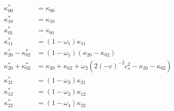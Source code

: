 \documentclass{article}
\begin{document}
\begin{equation}
  \begin{aligned}
    \kappa_{00}^{*} & = \kappa_{00} \\
    \kappa_{10}^{*} & = \kappa_{10} \\
    \kappa_{01}^{*} & = \kappa_{01} \\
    \kappa_{11}^{*} & = (1-\omega_1)\kappa_{11} \\
    \kappa_{20}^{*} - \kappa_{02}^{*}
      & = (1-\omega_1) (\kappa_{20} - \kappa_{02}) \\
    \kappa_{20}^{*} + \kappa_{02}^{*}
      & = \kappa_{20} + \kappa_{02} + \omega_2 \left( 2 {(-c)}^{-2} c_s^2 - \kappa_{20} - \kappa_{02} \right) \\
    \kappa_{21}^{*} & = (1-\omega_3)\kappa_{21} \\
    \kappa_{12}^{*} & = (1-\omega_3)\kappa_{12} \\
    \kappa_{22}^{*} & = (1-\omega_4)\kappa_{22}
  \end{aligned}
\end{equation}
\end{document}
